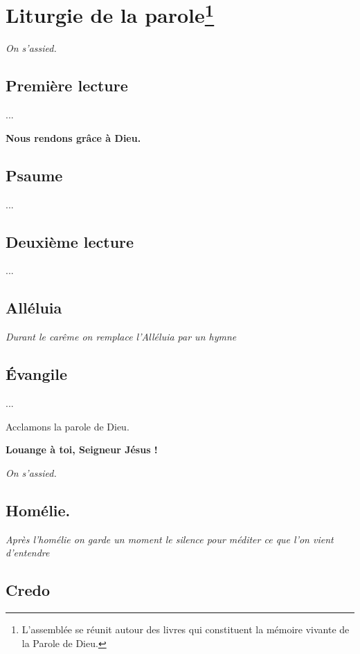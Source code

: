 \section*{Liturgie de la parole\footnote{L'assemblée se réunit autour des livres qui constituent la                
mémoire vivante de la Parole de Dieu.}}

\emph{On s'assied.}

\subsection*{Première lecture}

...

{\bf Nous rendons grâce à Dieu.}

\subsection*{Psaume}

...

\subsection*{Deuxième lecture}

...


\subsection*{Alléluia}


\emph{Durant le carême on remplace l'Alléluia par un hymne}


\subsection*{Évangile}

...

Acclamons la parole de Dieu.

{\bf Louange à toi, Seigneur Jésus !}


\emph{On s'assied.}


\subsection*{Homélie.}

\emph{Après l'homélie on garde un moment le silence pour méditer ce que l'on vient d'entendre}

\subsection*{Credo}

